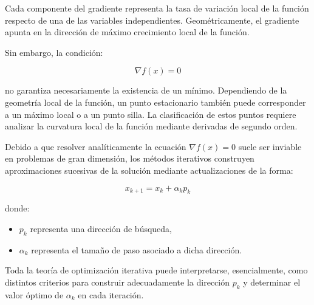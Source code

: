 Cada componente del gradiente representa la tasa de variación local de la función respecto de una de las variables independientes. Geométricamente, el gradiente apunta en la dirección de máximo crecimiento local de la función.

Sin embargo, la condición:

\[
\nabla f(x)=0
\]

no garantiza necesariamente la existencia de un mínimo. Dependiendo de la geometría local de la función, un punto estacionario también puede corresponder a un máximo local o a un punto silla. La clasificación de estos puntos requiere analizar la curvatura local de la función mediante derivadas de segundo orden.

Debido a que resolver analíticamente la ecuación \(\nabla f(x)=0\) suele ser inviable en problemas de gran dimensión, los métodos iterativos construyen aproximaciones sucesivas de la solución mediante actualizaciones de la forma:

\[
x_{k+1}=x_k+\alpha_k p_k
\]

donde:
\begin{itemize}
    \item \(p_k\) representa una dirección de búsqueda,
    \item \(\alpha_k\) representa el tamaño de paso asociado a dicha dirección.
\end{itemize}

Toda la teoría de optimización iterativa puede interpretarse, esencialmente, como distintos criterios para construir adecuadamente la dirección \(p_k\) y determinar el valor óptimo de \(\alpha_k\) en cada iteración.